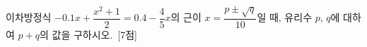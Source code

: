 이차방정식 $-0.1x+\dfrac{x^2+1}{2}=0.4-\dfrac{4}{5}x$의 근이 $x=\dfrac{p\pm\sqrt{q}}{10}$일 때, 유리수 $p$, $q$에 대하여 $p+q$의 값을 구하시오.~\mbox{\mbox{[7점]}}
